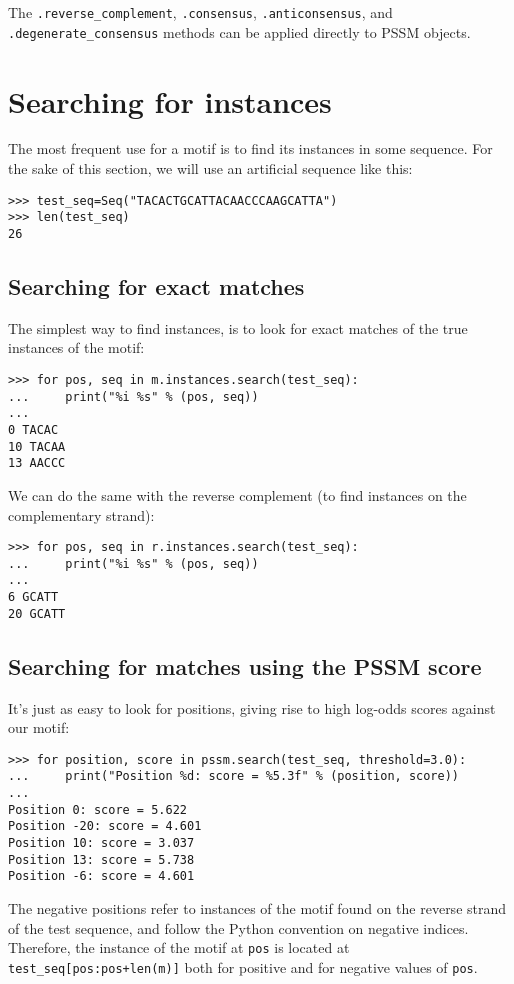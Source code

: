 The \verb+.reverse_complement+, \verb+.consensus+, \verb+.anticonsensus+, and
\verb+.degenerate_consensus+ methods can be applied directly to PSSM objects.

\section{Searching for instances}
\label{sec:search}

The most frequent use for a motif is to find its instances in some
sequence. For the sake of this section, we will use an artificial sequence like this:

\begin{verbatim}
>>> test_seq=Seq("TACACTGCATTACAACCCAAGCATTA")
>>> len(test_seq)
26
\end{verbatim}

\subsection{Searching for exact matches}

The simplest way to find instances, is to look for exact matches of
the true instances of the motif:
\begin{verbatim}
>>> for pos, seq in m.instances.search(test_seq):
...     print("%i %s" % (pos, seq))
...
0 TACAC
10 TACAA
13 AACCC
\end{verbatim}
We can do the same with the reverse complement (to find instances on the complementary strand):
\begin{verbatim}
>>> for pos, seq in r.instances.search(test_seq):
...     print("%i %s" % (pos, seq))
...
6 GCATT
20 GCATT
\end{verbatim}

\subsection{Searching for matches using the PSSM score}

It's just as easy to look for positions, giving rise to high log-odds scores against our motif:
\begin{verbatim}
>>> for position, score in pssm.search(test_seq, threshold=3.0):
...     print("Position %d: score = %5.3f" % (position, score))
...
Position 0: score = 5.622
Position -20: score = 4.601
Position 10: score = 3.037
Position 13: score = 5.738
Position -6: score = 4.601
\end{verbatim}
The negative positions refer to instances of the motif found on the
reverse strand of the test sequence, and follow the Python convention
on negative indices. Therefore, the instance of the motif at \verb|pos|
is located at \verb|test_seq[pos:pos+len(m)]| both for positive and for
negative values of \verb|pos|.


